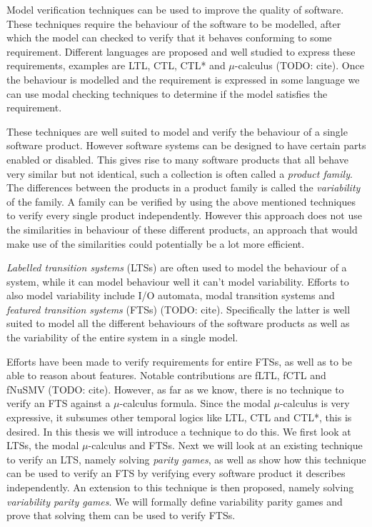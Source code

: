 Model verification techniques can be used to improve the quality of software. These techniques require the behaviour of the software to be modelled, after which the model can checked to verify that it behaves conforming to some requirement. Different languages are proposed and well studied to express these requirements, examples are LTL, CTL, CTL* and $\mu$-calculus (TODO: cite). Once the behaviour is modelled and the requirement is expressed in some language we can use modal checking techniques to determine if the model satisfies the requirement.

These techniques are well suited to model and verify the behaviour of a single software product. However software systems can be designed to have certain parts enabled or disabled. This gives rise to many software products that all behave very similar but not identical, such a collection is often called a \textit{product family}. The differences between the products in a product family is called the \textit{variability} of the family. A family can be verified by using the above mentioned techniques to verify every single product independently. However this approach does not use the similarities in behaviour of these different products, an approach that would make use of the similarities could potentially be a lot more efficient.

\textit{Labelled transition systems} (LTSs) are often used to model the behaviour of a system, while it can model behaviour well it can't model variability. Efforts to also model variability include I/O automata, modal transition systems and \textit{featured transition systems} (FTSs) (TODO: cite). Specifically the latter is well suited to model all the different behaviours of the software products as well as the variability of the entire system in a single model.

Efforts have been made to verify requirements for entire FTSs, as well as to be able to reason about features. Notable contributions are fLTL, fCTL and fNuSMV (TODO: cite). However, as far as we know, there is no technique to verify an FTS against a $\mu$-calculus formula. Since the modal $\mu$-calculus is very expressive, it subsumes other temporal logics like LTL, CTL and CTL*, this is desired. In this thesis we will introduce a technique to do this. We first look at LTSs, the modal $\mu$-calculus and FTSs. Next we will look at an existing technique to verify an LTS, namely solving \textit{parity games}, as well as show how this technique can be used to verify an FTS by verifying every software product it describes independently. An extension to this technique is then proposed, namely solving \textit{variability parity games}. We will formally define variability parity games and prove that solving them can be used to verify FTSs.